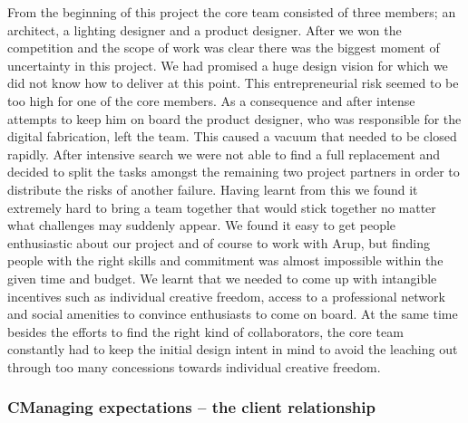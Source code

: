 From the beginning of this project the core team consisted of three members; an architect, a lighting designer and a product designer. After we won the competition and the scope of work was clear there was the biggest moment of uncertainty in this project. We had promised a huge design vision for which we did not know how to deliver at this point. This entrepreneurial risk seemed to be too high for one of the core members. As a consequence and after intense attempts to keep him on board the product designer, who was responsible for the digital fabrication, left the team. This caused a vacuum that needed to be closed rapidly. After intensive search we were not able to find a full replacement and decided to split the tasks amongst the remaining two project partners in order to distribute the risks of another failure. Having learnt from this we found it extremely hard to bring a team together that would stick together no matter what challenges may suddenly appear. We found it easy to get people enthusiastic about our project and of course to work with Arup, but finding people with the right skills and commitment was almost impossible within the given time and budget. We learnt that we needed to come up with intangible incentives such as individual creative freedom, access to a professional network and social amenities to convince enthusiasts to come on board. At the same time besides the efforts to find the right kind of collaborators, the core team constantly had to keep the initial design intent in mind to avoid the leaching out through too many concessions towards individual creative freedom. 

\subsubsection*{CManaging expectations – the client relationship}

